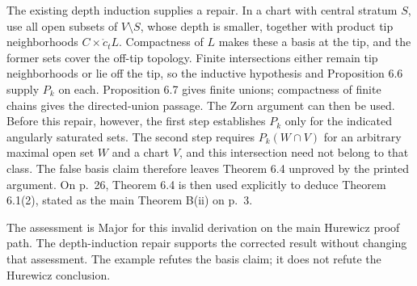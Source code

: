 \documentclass[10pt]{article}
\begin{document}
The existing depth induction supplies a repair. In a chart with central stratum \(S\), use all open subsets of \(V\setminus S\), whose depth is smaller, together with product tip neighborhoods \(C\times\mathring c_tL\). Compactness of \(L\) makes these a basis at the tip, and the former sets cover the off-tip topology. Finite intersections either remain tip neighborhoods or lie off the tip, so the inductive hypothesis and Proposition 6.6 supply \(P_k\) on each. Proposition 6.7 gives finite unions; compactness of finite chains gives the directed-union passage. The Zorn argument can then be used. Before this repair, however, the first step establishes \(P_k\) only for the indicated angularly saturated sets. The second step requires \(P_k(W\cap V)\) for an arbitrary maximal open set \(W\) and a chart \(V\), and this intersection need not belong to that class. The false basis claim therefore leaves Theorem 6.4 unproved by the printed argument. On p. 26, Theorem 6.4 is then used explicitly to deduce Theorem 6.1(2), stated as the main Theorem B(ii) on p. 3.\par
The assessment is Major for this invalid derivation on the main Hurewicz proof path. The depth-induction repair supports the corrected result without changing that assessment. The example refutes the basis claim; it does not refute the Hurewicz conclusion.\par
\end{document}
